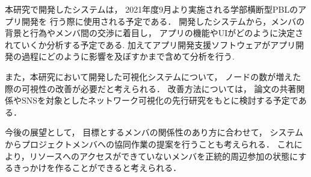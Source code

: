 
本研究で開発したシステムは，
2021年度9月より実施される学部横断型PBLのアプリ開発を
行う際に使用される予定である．
開発したシステムから，メンバの背景と行為やメンバ間の交渉に着目し，
アプリの機能やUIがどのように決定されていくか分析する予定である.
加えてアプリ開発支援ソフトウェアがアプリ開発の過程にどのように影響を及ぼすかまで含めて分析を行う.

また，本研究において開発した可視化システムについて，
ノードの数が増えた際の可視性の改善が必要だと考えられる．
改善方法については，
論文の共著関係やSNSを対象としたネットワーク可視化の先行研究をもとに検討する予定である．

今後の展望として，
目標とするメンバの関係性のあり方に合わせて，
システムからプロジェクトメンバへの協同作業の提案を行うことも考えられる．
これにより，リソースへのアクセスができていないメンバを正統的周辺参加の状態にするきっかけを作ることができると考えられる．
